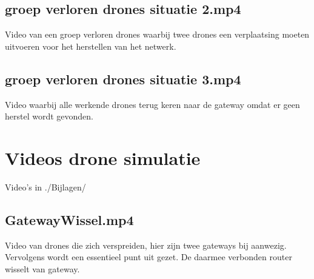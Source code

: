 \documentclass[a4paper, 11pt, oneside]{report}
\begin{document}
\section{groep verloren drones situatie 2.mp4}\label{sec:groep-verloren-drones-situatie-2mp4} Video van een groep verloren drones waarbij twee drones een verplaatsing moeten uitvoeren voor het herstellen van het netwerk.
\section{groep verloren drones situatie 3.mp4}\label{sec:groep-verloren-drones-situatie-3mp4} Video waarbij alle werkende drones terug keren naar de gateway omdat er geen herstel wordt gevonden.

\chapter{Videos drone simulatie}\label{sec:videos-drone-simulatie}
Video's in ./Bijlagen/
\section{GatewayWissel.mp4}\label{sec:gatewaywisselmp4}
Video van drones die zich verspreiden, hier zijn twee gateways bij aanwezig.
Vervolgens wordt een essentieel punt uit gezet. 
De daarmee verbonden router wisselt van gateway. 
\end{document}
